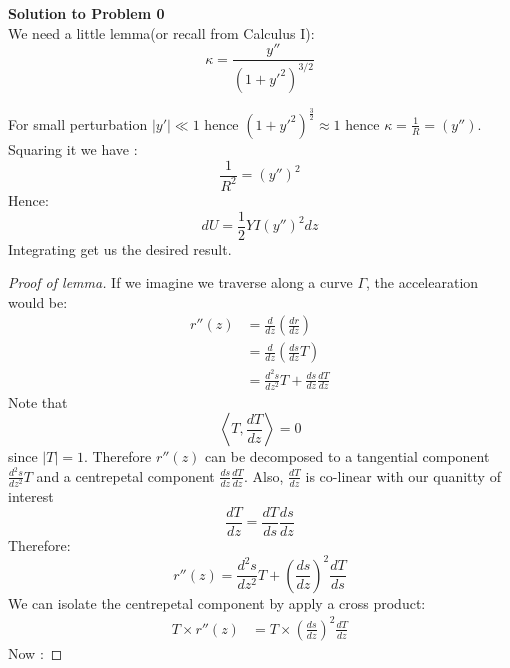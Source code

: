 \begin{framed}
\textbf{Solution to Problem 0}\\
We need a little lemma(or recall from Calculus I):
\begin{equation}
\kappa = \frac{y''}{(1+y'^2)^{3/2}}
\end{equation}

For small perturbation $|y'|\ll 1$ hence $(1+y'^2)^{\frac32} \approx 1$ hence
$\kappa = \frac{1}{R}=(y'')$. Squaring it we have :
\begin{equation}
\frac{1}{R^2}=(y'')^2
\end{equation}
Hence:
\begin{equation}
dU=\frac12 YI (y'')^2 dz
\end{equation}
Integrating get us the desired result.

\begin{proof}[Proof of lemma]If we imagine we traverse along a curve $\Gamma$, the accelearation would be:
\begin{equation}
\begin{aligned}
r''(z) &= \frac{d}{dz}\left(\frac{dr}{dz}\right) \\
&=  \frac{d}{dz}\left(\frac{ds}{dz}T\right)  \\
&= \frac{d^2s}{dz^2}T + \frac{ds}{dz}\frac{dT}{dz}
\end{aligned}
\end{equation}
Note that
\begin{equation}
\left\langle T, \frac{dT}{dz}\right\rangle=0
\end{equation}
since $|T|=1$. Therefore $r''(z)$ can be decomposed to a tangential component $\frac{d^2s}{dz^2}T$ and a centrepetal component $\frac{ds}{dz}\frac{dT}{dz}$.
Also, $\frac{dT}{dz}$ is co-linear with our quanitty of interest
\begin{equation}
\frac{dT}{dz}=\frac{dT}{ds}\frac{ds}{dz}
\end{equation}
Therefore:
\begin{equation}
\boxed{r''(z)= \frac{d^2s}{dz^2}T + \left(\frac{ds}{dz}\right)^2 \frac{dT}{ds}}
\end{equation}
We can isolate the centrepetal component by apply a cross product:
\begin{equation}
\begin{aligned}
T\times r''(z) &= T \times \left(\frac{ds}{dz}\right)^2\frac{dT}{dz}
\end{aligned}
\end{equation}
Now :


\end{proof}
\end{framed}
